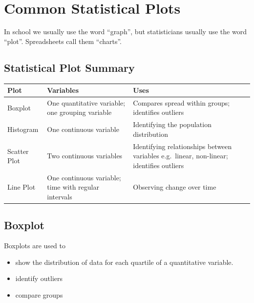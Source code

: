 \documentclass[
]{book}
\providecommand{\tightlist}{%
  \setlength{\itemsep}{0pt}\setlength{\parskip}{0pt}}
\begin{document}
\section{Common Statistical Plots}\label{common-statistical-plots}

In school we usually use the word ``graph'', but statisticians usually use the word ``plot''. Spreadsheets call them ``charts''.

\subsection{Statistical Plot Summary}\label{stat_plot_summary}

\begin{longtable}[]{@{}
  >{\raggedright\arraybackslash}p{}
  >{\raggedright\arraybackslash}p{}
  >{\raggedright\arraybackslash}p{}@{}}
\toprule\noalign{}
\begin{minipage}[b]{\linewidth}\raggedright
Plot
\end{minipage} & \begin{minipage}[b]{\linewidth}\raggedright
Variables
\end{minipage} & \begin{minipage}[b]{\linewidth}\raggedright
Uses
\end{minipage} \\
\midrule\noalign{}
\endhead
\bottomrule\noalign{}
\endlastfoot
Boxplot & One quantitative variable; one grouping variable & Compares spread within groups; identifies outliers \\
Histogram & One continuous variable & Identifying the population distribution \\
Scatter Plot & Two continuous variables & Identifying relationships between variables e.g.~linear, non-linear; identifies outliers \\
Line Plot & One continuous variable; time with regular intervals & Observing change over time \\
\end{longtable}

\subsection{Boxplot}\label{boxplot}

Boxplots are used to

\begin{itemize}
\tightlist
\item
  show the distribution of data for each quartile of a quantitative variable.
\item
  identify outliers
\item
  compare groups
\end{itemize}
\end{document}
